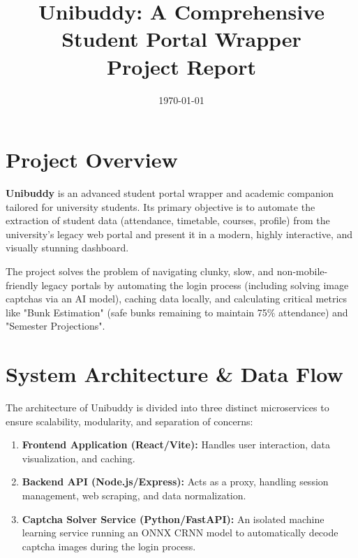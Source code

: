 \documentclass[11pt,a4paper]{article}
\title{\textbf{Unibuddy: A Comprehensive Student Portal Wrapper \\ Project Report}}
\author{}
\date{\today}
\begin{document}
\maketitle
\tableofcontents
\newpage

\section{Project Overview}
\textbf{Unibuddy} is an advanced student portal wrapper and academic companion tailored for university students. Its primary objective is to automate the extraction of student data (attendance, timetable, courses, profile) from the university's legacy web portal and present it in a modern, highly interactive, and visually stunning dashboard. 

The project solves the problem of navigating clunky, slow, and non-mobile-friendly legacy portals by automating the login process (including solving image captchas via an AI model), caching data locally, and calculating critical metrics like "Bunk Estimation" (safe bunks remaining to maintain 75\% attendance) and "Semester Projections".

\section{System Architecture \& Data Flow}
The architecture of Unibuddy is divided into three distinct microservices to ensure scalability, modularity, and separation of concerns:

\begin{enumerate}
    \item \textbf{Frontend Application (React/Vite):} Handles user interaction, data visualization, and caching.
    \item \textbf{Backend API (Node.js/Express):} Acts as a proxy, handling session management, web scraping, and data normalization.
    \item \textbf{Captcha Solver Service (Python/FastAPI):} An isolated machine learning service running an ONNX CRNN model to automatically decode captcha images during the login process.
\end{enumerate}
\end{document}
